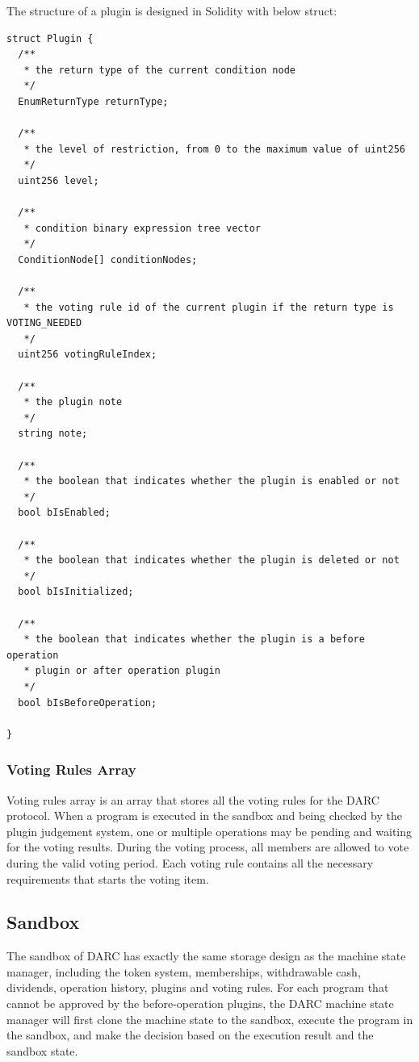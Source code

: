 \documentclass[main.tex]{subfiles}
\begin{document}
The structure of a plugin is designed in Solidity with below struct:

\begin{verbatim}
struct Plugin {
  /**
   * the return type of the current condition node
   */
  EnumReturnType returnType;

  /**
   * the level of restriction, from 0 to the maximum value of uint256
   */
  uint256 level;

  /**
   * condition binary expression tree vector
   */
  ConditionNode[] conditionNodes;

  /**
   * the voting rule id of the current plugin if the return type is VOTING_NEEDED
   */
  uint256 votingRuleIndex;

  /**
   * the plugin note
   */
  string note;

  /**
   * the boolean that indicates whether the plugin is enabled or not
   */
  bool bIsEnabled;

  /**
   * the boolean that indicates whether the plugin is deleted or not
   */
  bool bIsInitialized;

  /**
   * the boolean that indicates whether the plugin is a before operation 
   * plugin or after operation plugin
   */
  bool bIsBeforeOperation;
  
}
\end{verbatim}

\subsubsection{Voting Rules Array}

Voting rules array is an array that stores all the voting rules for the DARC protocol. When a program is executed in the sandbox and being checked by the plugin judgement system, one or multiple operations may be pending and waiting for the voting results. During the voting process, all members are allowed to vote during the valid voting period. Each voting rule contains all the necessary requirements that starts the voting item.


\subsection{Sandbox}

The sandbox of DARC has exactly the same storage design as the machine state manager, including the token system, memberships, withdrawable cash, dividends, operation history, plugins and voting rules. For each program that cannot be approved by the before-operation plugins, the DARC machine state manager will first clone the machine state to the sandbox, execute the program in the sandbox, and make the decision based on the execution result and the sandbox state. 
\end{document}
